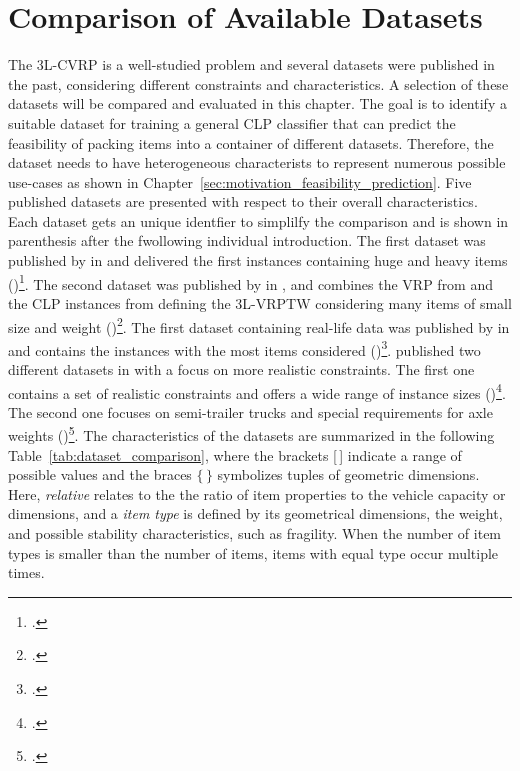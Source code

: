\chapter{Comparison of Available Datasets}
\label{sec:dataset_selection}

The \gls{3L-CVRP} is a well-studied problem and several datasets were published in the past, considering
different constraints and characteristics. A selection of these datasets will be compared and evaluated
in this chapter. The goal is to identify a suitable dataset for training a general \gls{CLP} classifier that can predict
the feasibility of packing items into a container of different datasets. Therefore, the dataset needs
to have heterogeneous characterists to represent numerous possible use-cases
as shown in Chapter~\ref{sec:motivation_feasibility_prediction}. Five published  datasets are presented with respect to their overall characteristics.
Each dataset gets an unique identfier to simplilfy the comparison and is shown in parenthesis
after the fwollowing individual introduction. The first  dataset was published by \citeauthor*{gendreau_tabu_2006} in
\citeyear{gendreau_tabu_2006} and delivered the first  instances containing huge and heavy items (\gendreauDataSet)\footcite[cf.][]{gendreau_tabu_2006}.
The second dataset was published by \citeauthor*{moura_integrated_2009} in \citeyear{moura_integrated_2009},
and combines the \gls{VRP} from \citeauthor*{solomon_algorithms_1987} and the \gls{CLP} instances from
\citeauthor*{bischoff_issues_1995} defining the \gls{3L-VRPTW} considering
many items of small size and weight (\mouraDataSet)\footcites[cf.][]{solomon_algorithms_1987,bischoff_issues_1995}[][]{moura_integrated_2009}.
The first dataset containing real-life data was published by \citeauthor*{ceschia_local_2013} in \citeyear{ceschia_local_2013}
and contains the instances with the most items considered (\ceschiaDataSet)\footcite[cf.][]{ceschia_local_2013}.
\citeauthor*{krebs_advanced_2021} published two different datasets in
\citeyear{krebs_advanced_2021} with a focus on more realistic constraints. The first one contains a set
of realistic constraints and offers a wide range of instance sizes (\krebsADataSet)\footcite[cf.][]{krebs_advanced_2021}.
The second one focuses on semi-trailer trucks and special requirements for axle weights (\krebsBDataSet)\footcite[cf.][]{krebs_axle_2021}.
The characteristics of the datasets are summarized in the following Table~\ref{tab:dataset_comparison},
where the brackets [\,] indicate a range of possible values and the braces $\{\,\}$ symbolizes tuples of geometric dimensions.
Here, \textit{relative} relates to the the ratio of item properties to the vehicle capacity or dimensions,
and a \textit{item type} is defined by its geometrical dimensions, the weight, and possible stability characteristics, such as fragility.
When the number of item types is smaller than the number of items, items with equal type occur multiple times.

